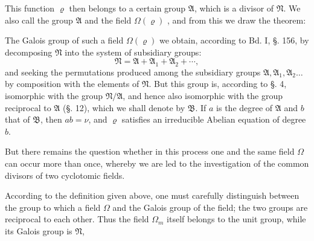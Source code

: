 This function $\varrho$ then belongs to a certain group $\mathfrak{A}$,
which is a divisor of $\mathfrak{N}$. We also call the group $\mathfrak{A}$ and
the field $\Omega(\varrho)$ , and from this we draw the
theorem:


The Galois group of such a field $\Omega(\varrho)$ we obtain, according to Bd. I, §. 156, by decomposing $\mathfrak{N}$ into the system of
subsidiary groups:
\[
\mathfrak{N} = \mathfrak{A} + \mathfrak{A}_1 + \mathfrak{A}_2 + \cdots,
\]
and seeking the permutations produced among the subsidiary groups $\mathfrak{A}, \mathfrak{A}_1, \mathfrak{A}_2 \ldots$ by composition
with the elements of $\mathfrak{N}$. But this group is, according to §. 4, isomorphic with the
group $\mathfrak{N}/\mathfrak{A}$, and hence also isomorphic with the group reciprocal to $\mathfrak{A}$
(§. 12), which we shall denote by $\mathfrak{B}$. If $a$ is the degree of $\mathfrak{A}$
and $b$ that of $\mathfrak{B}$, then $ab = \nu$, and $\varrho$ satisfies an irreducible
Abelian equation of degree $b$.


But there remains the question whether in this process one and
the same field $\Omega$ can occur more than once, whereby we are led to
the investigation of the common divisors of two cyclotomic fields.

According to the definition given above, one must carefully distinguish between the group to which a field $\Omega$ 
and the Galois group of the field; the two groups are
reciprocal to each other. Thus the field $\Omega_m$ itself belongs to the
unit group, while its Galois group is $\mathfrak{N}$,
